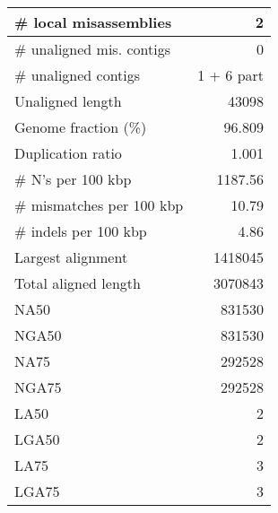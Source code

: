 \documentclass[12pt,a4paper]{article}
\begin{document}
\begin{table}[ht]
\begin{center}
\begin{tabular}{|l*{1}{|r}|}
\# local misassemblies & 2 \\ \hline
\# unaligned mis. contigs & 0 \\ \hline
\# unaligned contigs & 1 + 6 part \\ \hline
Unaligned length & 43098 \\ \hline
Genome fraction (\%) & 96.809 \\ \hline
Duplication ratio & 1.001 \\ \hline
\# N's per 100 kbp & 1187.56 \\ \hline
\# mismatches per 100 kbp & 10.79 \\ \hline
\# indels per 100 kbp & 4.86 \\ \hline
Largest alignment & 1418045 \\ \hline
Total aligned length & 3070843 \\ \hline
NA50 & 831530 \\ \hline
NGA50 & 831530 \\ \hline
NA75 & 292528 \\ \hline
NGA75 & 292528 \\ \hline
LA50 & 2 \\ \hline
LGA50 & 2 \\ \hline
LA75 & 3 \\ \hline
LGA75 & 3 \\ \hline
\end{tabular}
\end{center}
\end{table}
\end{document}
